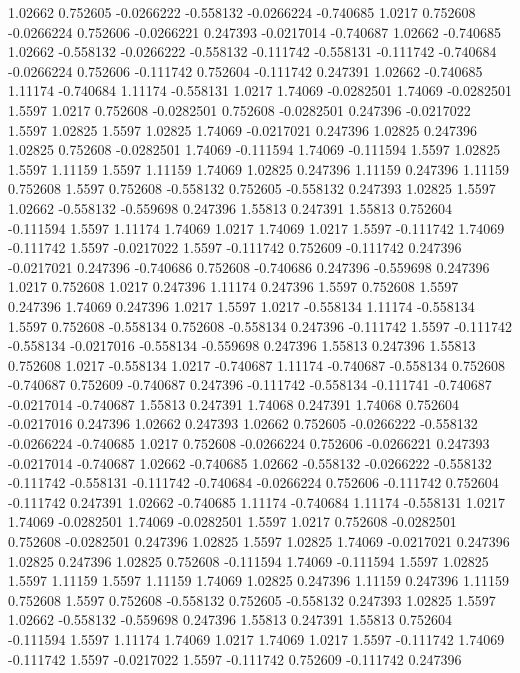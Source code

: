 1.02662 0.752605
-0.0266222 -0.558132
-0.0266224 -0.740685
1.0217 0.752608
-0.0266224 0.752606
-0.0266221 0.247393
-0.0217014 -0.740687
1.02662 -0.740685
1.02662 -0.558132
-0.0266222 -0.558132
-0.111742 -0.558131
-0.111742 -0.740684
-0.0266224 0.752606
-0.111742 0.752604
-0.111742 0.247391
1.02662 -0.740685
1.11174 -0.740684
1.11174 -0.558131
1.0217 1.74069
-0.0282501 1.74069
-0.0282501 1.5597
1.0217 0.752608
-0.0282501 0.752608
-0.0282501 0.247396
-0.0217022 1.5597
1.02825 1.5597
1.02825 1.74069
-0.0217021 0.247396
1.02825 0.247396
1.02825 0.752608
-0.0282501 1.74069
-0.111594 1.74069
-0.111594 1.5597
1.02825 1.5597
1.11159 1.5597
1.11159 1.74069
1.02825 0.247396
1.11159 0.247396
1.11159 0.752608
1.5597 0.752608
-0.558132 0.752605
-0.558132 0.247393
1.02825 1.5597
1.02662 -0.558132
-0.559698 0.247396
1.55813 0.247391
1.55813 0.752604
-0.111594 1.5597
1.11174 1.74069
1.0217 1.74069
1.0217 1.5597
-0.111742 1.74069
-0.111742 1.5597
-0.0217022 1.5597
-0.111742 0.752609
-0.111742 0.247396
-0.0217021 0.247396
-0.740686 0.752608
-0.740686 0.247396
-0.559698 0.247396
1.0217 0.752608
1.0217 0.247396
1.11174 0.247396
1.5597 0.752608
1.5597 0.247396
1.74069 0.247396
1.0217 1.5597
1.0217 -0.558134
1.11174 -0.558134
1.5597 0.752608
-0.558134 0.752608
-0.558134 0.247396
-0.111742 1.5597
-0.111742 -0.558134
-0.0217016 -0.558134
-0.559698 0.247396
1.55813 0.247396
1.55813 0.752608
1.0217 -0.558134
1.0217 -0.740687
1.11174 -0.740687
-0.558134 0.752608
-0.740687 0.752609
-0.740687 0.247396
-0.111742 -0.558134
-0.111741 -0.740687
-0.0217014 -0.740687
1.55813 0.247391
1.74068 0.247391
1.74068 0.752604
-0.0217016 0.247396
1.02662 0.247393
1.02662 0.752605
-0.0266222 -0.558132
-0.0266224 -0.740685
1.0217 0.752608
-0.0266224 0.752606
-0.0266221 0.247393
-0.0217014 -0.740687
1.02662 -0.740685
1.02662 -0.558132
-0.0266222 -0.558132
-0.111742 -0.558131
-0.111742 -0.740684
-0.0266224 0.752606
-0.111742 0.752604
-0.111742 0.247391
1.02662 -0.740685
1.11174 -0.740684
1.11174 -0.558131
1.0217 1.74069
-0.0282501 1.74069
-0.0282501 1.5597
1.0217 0.752608
-0.0282501 0.752608
-0.0282501 0.247396
1.02825 1.5597
1.02825 1.74069
-0.0217021 0.247396
1.02825 0.247396
1.02825 0.752608
-0.111594 1.74069
-0.111594 1.5597
1.02825 1.5597
1.11159 1.5597
1.11159 1.74069
1.02825 0.247396
1.11159 0.247396
1.11159 0.752608
1.5597 0.752608
-0.558132 0.752605
-0.558132 0.247393
1.02825 1.5597
1.02662 -0.558132
-0.559698 0.247396
1.55813 0.247391
1.55813 0.752604
-0.111594 1.5597
1.11174 1.74069
1.0217 1.74069
1.0217 1.5597
-0.111742 1.74069
-0.111742 1.5597
-0.0217022 1.5597
-0.111742 0.752609
-0.111742 0.247396
